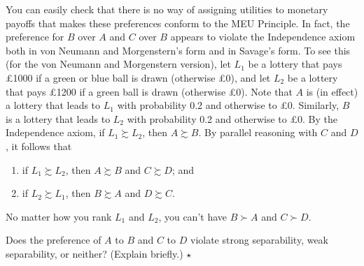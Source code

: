 You can easily check that there is no way of assigning utilities to
monetary payoffs that makes these preferences conform to the MEU
Principle. In fact, the preference for $B$ over $A$ and $C$ over $B$
appears to violate the Independence axiom both in von Neumann and
Morgenstern's form and in Savage's form. To see this (for the von
Neumann and Morgenstern version), let $L_1$ be a lottery that pays
£1000 if a green or blue ball is drawn (otherwise £0), and let $L_2$
be a lottery that pays £1200 if a green ball is drawn (otherwise
£0). Note that $A$ is (in effect) a lottery that leads to $L_1$ with
probability 0.2 and otherwise to £0. Similarly, $B$ is a lottery that
leads to $L_2$ with probability 0.2 and otherwise to £0. By the
Independence axiom, if $L_1 \succsim L_2$, then $A \succsim B$. By
parallel reasoning with $C$ and $D$, it follows that
\begin{enumerate}
  \itemsep0em 
\item if $L_1 \succsim L_2$, then $A \succsim B$ and $C \succsim D$; and
\item if $L_2 \succsim L_1$, then $B \succsim A$ and $D \succsim C$.
\end{enumerate}
No matter how you rank $L_1$ and $L_2$, you can't have $B \succ A$ and $C \succ D$.

\begin{exercise}
  Does the preference of $A$ to $B$ and $C$ to $D$ violate strong
  separability, weak separability, or neither? (Explain briefly.)
  $\star$
\end{exercise}


